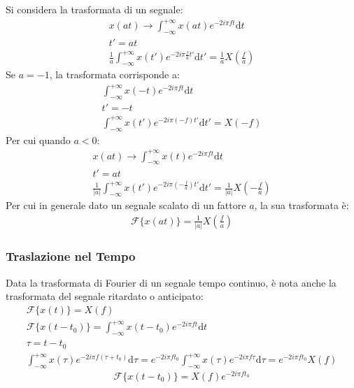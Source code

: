 \documentclass{article}
\newcommand{\df}{\mathrm{d}}
\numberwithin{equation}{subsection}
\begin{document}
Si considera la trasformata di un segnale:
\begin{gather*}
    x(at)\to\displaystyle\int_{-\infty}^{+\infty}x(at)e^{-2i\pi ft}\df t\\
    t'=at\\
    \displaystyle\frac{1}{a}\int_{-\infty}^{+\infty}x(t')e^{-2i\pi \frac{f}{a}t'}\df t'=\frac{1}{a}X\left(\frac{f}{a}\right)
\end{gather*}
Se $a=-1$, la trasformata corrisponde a:
\begin{gather*}
    \displaystyle\int_{-\infty}^{+\infty}x(-t)e^{-2i\pi ft}\df t\\
    t'=-t\\
    \displaystyle\int_{-\infty}^{+\infty}x(t')e^{-2i\pi(- f)t'}\df t'=X(-f)
\end{gather*}
Per cui quando $a<0$:
\begin{gather*}
    x(at)\to\displaystyle\int_{-\infty}^{+\infty}x(t)e^{-2i\pi ft}\df t\\
    t'=at\\
    \displaystyle\frac{1}{|a|}\int_{-\infty}^{+\infty}x(t')e^{-2i\pi \left(-\frac{f}{a}\right)t'}\df t'=\frac{1}{|a|}X\left(-\frac{f}{a}\right)
\end{gather*}
Per cui in generale dato un segnale scalato di un fattore $a$, la sua trasformata è:
\begin{gather}
    \mathscr{F}\{x(at)\}=\displaystyle\frac{1}{|a|}X\left(\frac{f}{a}\right)
\end{gather}

\subsubsection{Traslazione nel Tempo}

Data la trasformata di Fourier di un segnale tempo continuo, è nota anche la trasformata del segnale ritardato o anticipato:
\begin{gather*}
    \mathscr{F}\{x(t)\}=X(f)\\
    \mathscr{F}\{x(t-t_0)\}=\displaystyle\int_{-\infty}^{+\infty}x(t-t_0)e^{-2i\pi ft}\df t\\
    \tau=t-t_0\\
    \displaystyle\int_{-\infty}^{+\infty}x(\tau)e^{-2i\pi f(\tau+t_0)}\df\tau=e^{-2i\pi ft_0}\int_{-\infty}^{+\infty}x(\tau)e^{-2i\pi f\tau}\df\tau=e^{-2i\pi ft_0}X(f)
\end{gather*}
\begin{equation}
    \mathscr{F}\{x(t-t_0)\}=X(f)e^{-2i\pi ft_0}
\end{equation}
\end{document}
